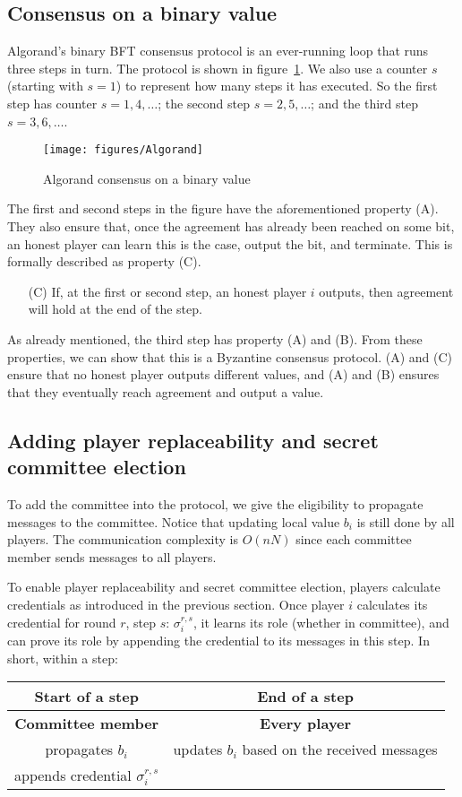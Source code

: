 \documentclass{article}
\begin{document}
\subsection*{Consensus on a binary value}

Algorand's binary BFT consensus protocol is an ever-running loop that runs three steps in turn. The protocol is shown in figure~\ref{fig:bba}.  We also use a counter $s$ (starting with $s=1$) to represent how many steps it has executed. So the first step has counter $s=1,4,\ldots$; the second step $s=2,5,\ldots$; and the third step $s=3,6,\ldots$. 

\begin{figure}[thb]
    \centering
    \texttt{[image: figures/Algorand]}
    \caption{Algorand consensus on a binary value}
    \label{fig:bba}
\end{figure}
The first and second steps in the figure have the aforementioned property (A). They also ensure that, once the agreement has already been reached on some bit, an honest player can learn this is the case, output the bit, and terminate. This is formally described as property (C).
\begin{itemize}
    \item[(C)] If, at the first or second step, an honest player $i$ outputs, then agreement will hold at the end of the step.
\end{itemize}
As already mentioned, the third step has property (A) and (B). From these properties, we can show that this is a Byzantine consensus protocol. (A) and (C) ensure that no honest player outputs different values, and (A) and (B) ensures that they eventually reach agreement and output a value.

\subsection*{Adding player replaceability and secret committee election}
To add the committee into the protocol, we give the eligibility to propagate messages to the committee. Notice that updating local value $b_i$ is still done by all players. The communication complexity is $O(nN)$ since each committee member sends messages to all players.

To enable player replaceability and secret committee election, players calculate credentials as introduced in the previous section. Once player $i$ calculates its credential for round $r$, step $s$: $\sigma_{i}^{r,s}$, it learns its role (whether in committee), and can prove its role by appending the credential to its messages in this step. 
In short, within a step: 
\begin{center}
\begin{tabular}{|c|c|}
\hline
    Start of a step & End of a step \\
\hline
    \textbf{Committee member} &  \textbf{Every player}\\
    propagates $b_i$ & updates $b_i$ based on the received messages\\
    appends credential $\sigma_{i}^{r,s}$ &\\
\hline
\end{tabular}
\end{center}
\end{document}
